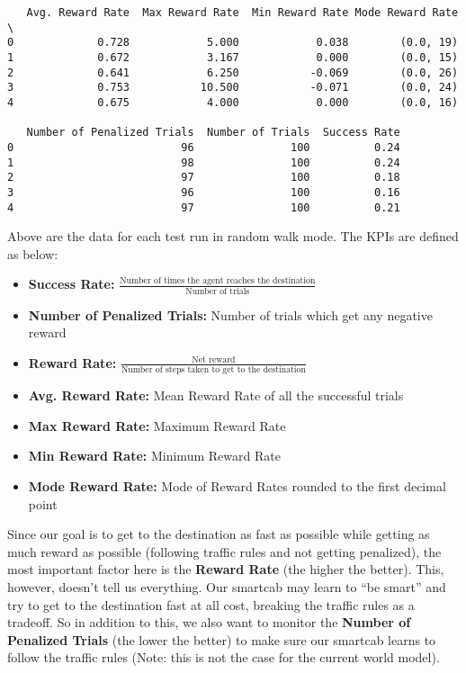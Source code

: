 \documentclass{article}
\providecommand{\tightlist}{%
      \setlength{\itemsep}{0pt}\setlength{\parskip}{0pt}}
\begin{document}
    \begin{verbatim}
   Avg. Reward Rate  Max Reward Rate  Min Reward Rate Mode Reward Rate  \
0             0.728            5.000            0.038        (0.0, 19)
1             0.672            3.167            0.000        (0.0, 15)
2             0.641            6.250           -0.069        (0.0, 26)
3             0.753           10.500           -0.071        (0.0, 24)
4             0.675            4.000            0.000        (0.0, 16)

   Number of Penalized Trials  Number of Trials  Success Rate
0                          96               100          0.24
1                          98               100          0.24
2                          97               100          0.18
3                          96               100          0.16
4                          97               100          0.21
    \end{verbatim}


    Above are the data for each test run in random walk mode. The KPIs are
defined as below:

\begin{itemize}
\tightlist
\item
  \textbf{Success Rate:}
  \(\frac{\text{Number of times the agent reaches the destination}}{\text{Number of trials}}\)
\item
  \textbf{Number of Penalized Trials:} Number of trials which get any
  negative reward
\item
  \textbf{Reward Rate:}
  \(\frac{\text{Net reward}}{\text{Number of steps taken to get to the destination}}\)
\item
  \textbf{Avg. Reward Rate:} Mean Reward Rate of all the successful
  trials
\item
  \textbf{Max Reward Rate:} Maximum Reward Rate
\item
  \textbf{Min Reward Rate:} Minimum Reward Rate
\item
  \textbf{Mode Reward Rate:} Mode of Reward Rates rounded to the first
  decimal point
\end{itemize}

Since our goal is to get to the destination as fast as possible while
getting as much reward as possible (following traffic rules and not
getting penalized), the most important factor here is the \textbf{Reward
Rate} (the higher the better). This, however, doesn't tell us
everything. Our smartcab may learn to ``be smart'' and try to get to the
destination fast at all cost, breaking the traffic rules as a tradeoff.
So in addition to this, we also want to monitor the \textbf{Number of
Penalized Trials} (the lower the better) to make sure our smartcab
learns to follow the traffic rules (Note: this is not the case for the
current world model).
\end{document}

